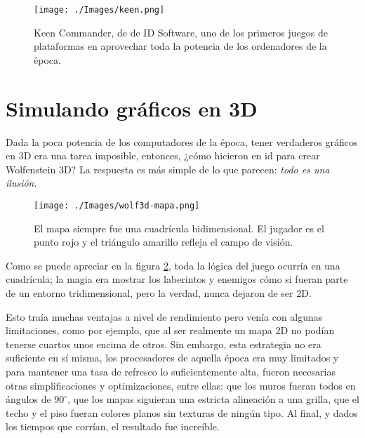 \begin{figure}[h!]
	\centering
	\texttt{[image: ./Images/keen.png]}
	\caption{Keen Commander, de de ID Software, uno de los primeros juegos de plataformas en aprovechar toda la potencia de los ordenadores de la época.}
	\label{keen}
\end{figure}
 



\newpage

\section{Simulando gráficos en 3D}


Dada la poca potencia de los computadores de la época, tener verdaderos gráficos en 3D era una tarea imposible, entonces, ¿cómo hicieron en id para crear Wolfenstein 3D? La respuesta es más simple de lo que parecen: \emph{todo es una ilusión}.

\begin{figure}[h!]
	\centering
	\texttt{[image: ./Images/wolf3d-mapa.png]}
	\caption{El mapa siempre fue una cuadrícula bidimensional. El jugador es el punto rojo y el triángulo amarillo refleja el campo de visión.}
	\label{wolf3d-mapa}
\end{figure}

Como se puede apreciar en la figura \ref{wolf3d-mapa}, toda la lógica del juego ocurría en una cuadrícula; la magia era mostrar los laberintos y enemigos cómo si fueran parte de un entorno tridimensional, pero la verdad, nunca dejaron de ser 2D.

Esto traía muchas ventajas a nivel de rendimiento pero venía con algunas limitaciones, como por ejemplo, que al ser realmente un mapa 2D no podían tenerse cuartos unos encima de otros. Sin embargo, esta estrategia no era suficiente en sí misma, los procesadores de aquella época era muy limitados y para mantener una tasa de refresco lo suficientemente alta, fueron necesarias otras simplificaciones y optimizaciones, entre ellas: que los muros fueran todos en ángulos de $90^{\circ}$, que los mapas siguieran una estricta alineación a una grilla, que el techo y el piso fueran colores planos sin texturas de ningún tipo. Al final, y dados los tiempos que corrían, el resultado fue increíble. 

